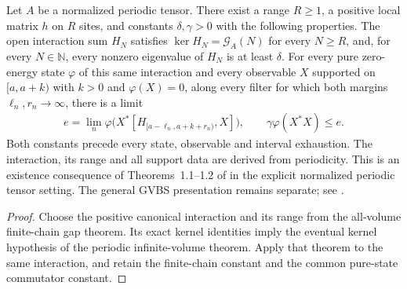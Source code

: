 \begin{theorem}
    \label{thm:periodic_parent_finite_quasi_local_gap}
    \leanok
    Let $A$ be a normalized periodic tensor. There exist a range $R\ge1$, a
    positive local matrix $h$ on $R$ sites, and constants $\delta,\gamma>0$
    with the following properties. The open interaction sum $H_N$ satisfies
    $\ker H_N=\mathcal G_A(N)$ for every $N\ge R$, and, for every
    $N\in\mathbb N$, every nonzero eigenvalue of $H_N$ is at least $\delta$.
    For every pure zero-energy state $\varphi$ of this same interaction and
    every observable $X$ supported on $[a,a+k)$ with $k>0$ and $\varphi(X)=0$,
    along every filter for which both margins $\ell_n,r_n\to\infty$, there is a limit
    \begin{align}
        e=\lim_n\varphi\bigl(X^*[H_{[a-\ell_n,a+k+r_n)},X]\bigr),\qquad
        \gamma\varphi(X^*X)\le e.
    \end{align}
    Both constants precede every state, observable and interval exhaustion.
    The interaction, its range and all support data are derived from periodicity.
    This is an existence consequence of Theorems~1.1--1.2 of
    \cite{Nachtergaele1996Spectral} in the explicit normalized periodic tensor
    setting. The general GVBS presentation remains separate; see
    \cite{gap:nachtergaele96_infinite_volume_ground_projection}.
\end{theorem}
\begin{proof}\leanok
    Choose the positive canonical interaction and its range from the all-volume
    finite-chain gap theorem. Its exact kernel identities imply the eventual
    kernel hypothesis of the periodic infinite-volume theorem. Apply that theorem
    to the same interaction, and retain the finite-chain constant and the common
    pure-state commutator constant.
\end{proof}


